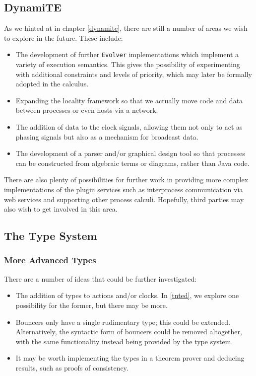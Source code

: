 \subsection{DynamiTE}
\label{future:dynamite}

As we hinted at in chapter \ref{dynamite}, there are still a number of
areas we wish to explore in the future.  These include:

\begin{itemize}
\item The development of further \texttt{Evolver} implementations
  which implement a variety of execution semantics.  This gives the
  possibility of experimenting with additional constraints and levels
  of priority, which may later be formally adopted in the calculus.
\item Expanding the locality framework so that we actually move code
  and data between processes or even hosts via a network.
\item The addition of data to the clock signals, allowing them not
  only to act as phasing signals but also as a mechanism for broadcast
  data.
\item The development of a parser and/or graphical design tool so that
  processes can be constructed from algebraic terms or diagrams,
  rather than Java code.
\end{itemize}

There are also plenty of possibilities for further work in providing
more complex implementations of the plugin services such as
interprocess communication via web services and supporting other
process calculi.  Hopefully, third parties may also wish to get
involved in this area.

\subsection{The Type System}
\label{future:types}

\subsubsection{More Advanced Types}

There are a number of ideas that could be further investigated:

\begin{itemize}
\item The addition of types to actions and/or clocks.  In \ref{tnted},
  we explore one possibility for the former, but there may be more.
\item Bouncers only have a single rudimentary type; this could be
  extended.  Alternatively, the syntactic form of bouncers could be
  removed altogether, with the same functionality instead being
  provided by the type system.
\item It may be worth implementing the types in a theorem prover and
  deducing results, such as proofs of consistency.
\end{itemize}

